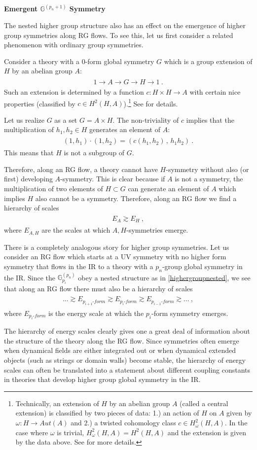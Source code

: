\documentclass[11pt]{article}
\newcommand{\eq}[1]{\begin{align}\begin{split}#1\end{split}\end{align}}
\def\IG{\mathbb{G}}
\begin{document}
\noindent\textbf{Emergent $\IG^{(p_n+1)}$ Symmetry }

 The nested higher group structure also has an effect on the emergence of higher group symmetries along RG flows. 
 To see this, let us first consider a related phenomenon with ordinary group symmetries.  
  
  Consider a theory with  a 0-form  global symmetry $G$ which is a group extension of $H$ by an abelian group $A$:
\eq{
1\longrightarrow A\longrightarrow G \longrightarrow H\longrightarrow 1~.
}
Such an extension is determined by a function $c:H\times H\to A$ with certain nice properties (classified by $c\in H^2(H,A)$).\footnote{Technically, an extension of $H$ by an abelian group $A$ (called a central extension) is classified by two pieces of data: 1.) an action of $H$ on $A$ given by $\omega:H\to Aut(A)$ and 2.) a twisted cohomology class $c\in H^2_\omega(H,A)$. In the case where $\omega$ is trivial, $H^2_\omega(H,A)=H^2(H,A)$ and the extension is given by the data above. See \cite{GmooreGroupTheory} for more details. 
}  See \cite{Dijkgraaf:1989pz,GmooreGroupTheory} for details. 

Let us realize $G$ as a set $G=A\times H$. The non-triviality of $c$ implies that the multiplication of $h_1,h_2\in H$ generates an element of $A$:
\eq{
(1,h_1)\cdot (1,h_2)=(c(h_1,h_2)\,,\, h_1h_2)~. 
}
This means that $H$ is not a subgroup of $G$. 

Therefore, along an RG flow, a theory cannot have $H$-symmetry without also (or first) developing $A$-symmetry. This is clear because if $A$ is not a symmetry, the multiplication of two elements of $H\subset G$ can generate an element of $A$ which implies $H$ also cannot be a symmetry. Therefore, along an RG flow we find a hierarchy of scales 
\eq{
 E_A\gtrsim  E_H~,
}
where $ E_{A,H}$ are the scales at which $A,H$-symmetries emerge. 

There is a completely analogous story for higher group symmetries. Let us consider an RG flow which starts at a UV symmetry with no higher form symmetry that flows in the IR to a theory with a $p_n$-group global symmetry in the IR. Since the $\IG^{(p_n)}_{p_i}$ obey a nested structure as in \eqref{highergroupnested}, we see that along an RG flow there must also be a hierarchy of scales
\eq{
...\gtrsim E_{p_{i+1}\text{-}form}\gtrsim  E_{p_{i}\text{-}form}\gtrsim  E_{p_{i-1}\text{-}form}\gtrsim...~,
}
where $E_{p_i\text{-}form}$ is the energy scale at which the $p_i$-form symmetry emerges. 

The hierarchy of energy scales clearly gives one a great deal of information about the structure of the theory along the RG flow. Since  symmetries  often emerge when dynamical fields are either integrated out or when dynamical extended objects (such as strings or domain walls) become stable, the hierarchy of energy scales can often be translated into a statement about different coupling constants in theories that develop higher group global symmetry in the IR.  
\end{document}
